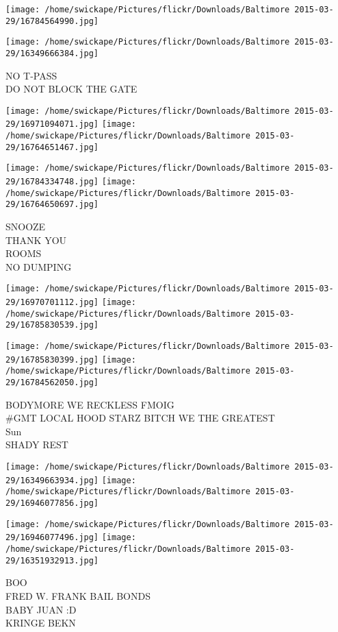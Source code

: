\documentclass[10pt,letterpaper]{article}
\begin{document}
\texttt{[image: /home/swickape/Pictures/flickr/Downloads/Baltimore 2015-03-29/16784564990.jpg]}

\vspace{0.25in}
\texttt{[image: /home/swickape/Pictures/flickr/Downloads/Baltimore 2015-03-29/16349666384.jpg]}

NO T{-}PASS\\
DO NOT BLOCK THE GATE
\pagebreak

\texttt{[image: /home/swickape/Pictures/flickr/Downloads/Baltimore 2015-03-29/16971094071.jpg]}
\texttt{[image: /home/swickape/Pictures/flickr/Downloads/Baltimore 2015-03-29/16764651467.jpg]}

\texttt{[image: /home/swickape/Pictures/flickr/Downloads/Baltimore 2015-03-29/16784334748.jpg]}
\texttt{[image: /home/swickape/Pictures/flickr/Downloads/Baltimore 2015-03-29/16764650697.jpg]}

SNOOZE\\
THANK YOU\\
ROOMS\\
NO DUMPING
\pagebreak

\texttt{[image: /home/swickape/Pictures/flickr/Downloads/Baltimore 2015-03-29/16970701112.jpg]}
\texttt{[image: /home/swickape/Pictures/flickr/Downloads/Baltimore 2015-03-29/16785830539.jpg]}

\texttt{[image: /home/swickape/Pictures/flickr/Downloads/Baltimore 2015-03-29/16785830399.jpg]}
\texttt{[image: /home/swickape/Pictures/flickr/Downloads/Baltimore 2015-03-29/16784562050.jpg]}

BODYMORE WE RECKLESS FMOIG\\
\#GMT LOCAL HOOD STARZ BITCH WE THE GREATEST\\
Sun\\
SHADY REST
\pagebreak

\texttt{[image: /home/swickape/Pictures/flickr/Downloads/Baltimore 2015-03-29/16349663934.jpg]}
\texttt{[image: /home/swickape/Pictures/flickr/Downloads/Baltimore 2015-03-29/16946077856.jpg]}

\texttt{[image: /home/swickape/Pictures/flickr/Downloads/Baltimore 2015-03-29/16946077496.jpg]}
\texttt{[image: /home/swickape/Pictures/flickr/Downloads/Baltimore 2015-03-29/16351932913.jpg]}

BOO\\
FRED W. FRANK BAIL BONDS\\
BABY JUAN :D\\
KRINGE BEKN
\pagebreak
\end{document}
